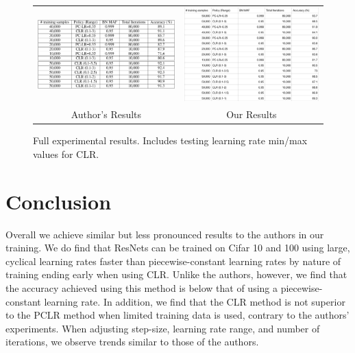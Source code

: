 \documentclass[10pt,twocolumn,letterpaper]{article}
\begin{document}
\begin{figure}[ht!]
    \begin{tabular}{cc}
        \includegraphics[trim=0 0 0 0, clip,
            width=3.25in]{images/their_table.png} &
        \includegraphics[trim=0 0 0 0, clip,
            width=3.25in]{images/our_table.png} \\
        Author's Results & Our Results \\
    \end{tabular}
    \caption{Full experimental results. Includes testing learning rate min/max values for CLR.}
    \label{fig:table}
\end{figure}


\section{Conclusion}
\label{sec:conclusion}
Overall we achieve similar but less pronounced results to the authors in our
training. We do find that ResNets can be trained on Cifar 10 and 100 using
large, cyclical learning rates faster than piecewise-constant learning rates by
nature of training ending early when using CLR.  Unlike the authors, however,
we find that the accuracy achieved using this method is below that of using a
piecewise-constant learning rate. In addition, we find that the CLR method is
not superior to the PCLR method when limited training data is used, contrary to
the authors' experiments. When adjusting step-size, learning rate range, and
number of iterations, we observe trends similar to those of the authors.
\end{document}
